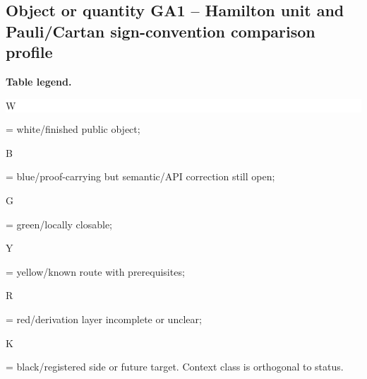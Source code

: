 \subsection*{Object or quantity GA1 -- Hamilton unit and Pauli/\allowbreak{}Cartan sign-convention comparison profile}
\hypertarget{objproof:GA1}{}
\par\smallskip\noindent\begin{minipage}{0.99\linewidth}\footnotesize\raggedright\textbf{Table legend.} \colorbox{white}{\strut W} = white/finished public object; \colorbox{cyan!20}{\strut B} = blue/proof-carrying but semantic/API correction still open; \colorbox{green!18}{\strut G} = green/locally closable; \colorbox{yellow!25}{\strut Y} = yellow/known route with prerequisites; \colorbox{red!20}{\strut R} = red/derivation layer incomplete or unclear; \colorbox{black!18}{\strut K} = black/registered side or future target. Context class is orthogonal to status.\end{minipage}\par\vspace{0.25em}

